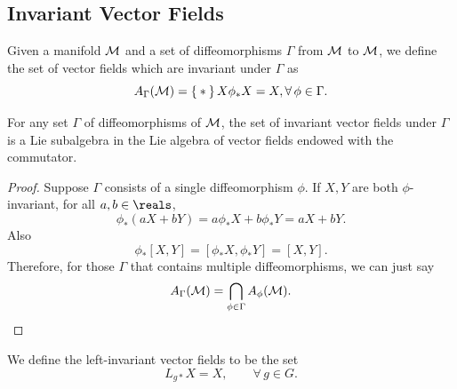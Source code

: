 \documentclass[../main.tex]{subfiles}
\begin{document}
\subsection{Invariant Vector Fields}
\begin{definition}\label{def:Invariant-Vector-Fields}
    Given a manifold \(\manifold[M]\) and a set of diffeomorphisms \(\Gamma\) from \(\manifold[M]\) to \(\manifold[M]\), we define the set of vector fields which are invariant under \(\Gamma\) as
    \[
        A_\Gamma(\manifold[M]) = \Set*{X}{\phi_*X = X, \forall\, \phi \in  \Gamma}.
    \]
\end{definition}
\begin{theorem}\label{thm:Invariant-Vector-Fields-Form-Subalgebra}
    For any set \(\Gamma\) of diffeomorphisms of \(\manifold[M]\), the set of invariant vector fields under \(\Gamma\) is a Lie subalgebra in the Lie algebra of vector fields endowed with the commutator.
\end{theorem}
\begin{proof}
    Suppose \(\Gamma\) consists of a single diffeomorphism \(\phi\). If \(X, Y\) are both \(\phi\)-invariant, for all \(a, b \in \reals\), 
    \[
    \phi_*(aX+bY) = a\phi_*X + b\phi_*Y = aX+bY.
    \]
    Also
    \[
        \phi_*[X, Y] = [\phi_*X, \phi_*Y] = [X, Y].
    \]
    Therefore, for those \(\Gamma\) that contains multiple diffeomorphisms, we can just say
    \[
        A_\Gamma(\manifold[M]) = \bigcap_{\phi \in \Gamma} A_{\phi}(\manifold[M]).
    \]
\end{proof}
\begin{definition}\label{def:Left-Invariant-Vector-Fields}
    We define the left-invariant vector fields to be the set
    \[
    L_{g*}X = X, \qquad \forall\, g \in G.
    \]
\end{definition}
\end{document}
